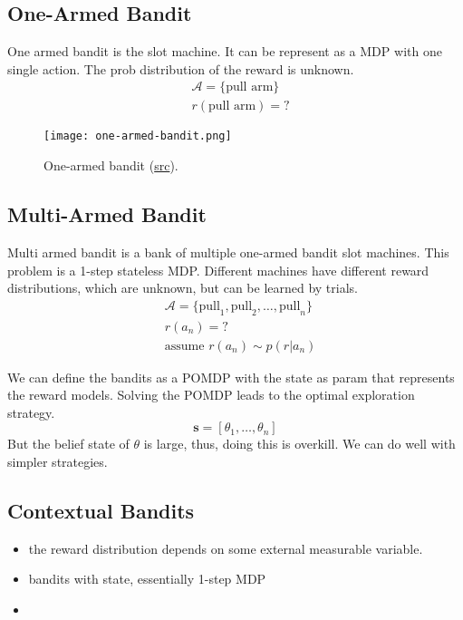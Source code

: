 \subsection{One-Armed Bandit}
One armed bandit is the slot machine. It can be represent as a \ac{MDP} with one single action. The \ac{prob} distribution of the reward is unknown.
\begin{align}
	&\mathcal{A} = \{\text{pull arm}\}\\
	&r(\text{pull arm}) = ?
\end{align}

\begin{figure}[hbt!]
	\centering
	\texttt{[image: one-armed-bandit.png]}
	\caption{One-armed bandit (\href{https://www.amazon.com/Armed-Bandit-Slot-Machine-Bank/dp/B001KYV9DW}{src}).}
\end{figure}

\subsection{Multi-Armed Bandit}
Multi armed bandit is a bank of multiple one-armed bandit slot machines. This problem is a 1-step stateless \ac{MDP}. Different machines have different reward distributions, which are unknown, but can be learned by trials.
\begin{align}
	&\mathcal{A} = \{\text{pull}_1, \text{pull}_2, \dots, \text{pull}_n\}\\
	&r(a_n) = ?\\
	&\text{assume } r(a_n) \sim p(r|a_n)
\end{align}

We can define the bandits as a \ac{POMDP} with the state as \ac{param} that represents the reward models. Solving the \ac{POMDP} leads to the optimal exploration strategy.
\[ \textbf{s} = [\theta_1, \dots, \theta_n]\]
But the belief state of $\theta$ is large, thus, doing this is overkill. We can do well with simpler strategies.

\subsection{Contextual Bandits}
\begin{itemize}
	\item the reward distribution depends on some external measurable variable.
	\item bandits with state, essentially 1-step \ac{MDP}
	\item \todo{}
\end{itemize}

